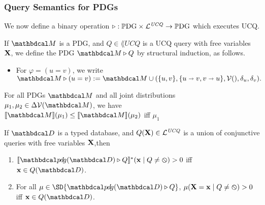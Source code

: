 \documentclass[the-pdg-manual.tex]{subfiles}
\begin{document}
\begin{defn}
\end{defn}


\subsubsection{Query Semantics for PDGs}

We now define a binary operation $\triangleright : \mathbb{P}\mathrm{DG} \times \mathcal L^{\mathit{UCQ}} \to \mathbb{P}\mathrm{DG}$ which executes UCQ.
\begin{defn}[\texorpdfstring{$\qq$}{>}]
  If $\dg M$ is a PDG, and $Q \in \lang{UCQ}$ is a UCQ query with free variables $\mathbf X$, we define the PDG $\dg M \qq Q$ by structural induction, as follows.
  
  \begin{itemize}
  	\item For $\varphi = (u=v)$, we write $\dg M \qq  (u = v) :=  \dg M \cup (\{u,v\}, \{u\shortrightarrow v, v\shortrightarrow u\}, \V(), \delta_{u}, \delta_{v}).$
  \end{itemize}
\end{defn}

\begin{inactive}
\begin{prop}
  For all PDGs $\dg M$ and all joint distributions $\mu_1, \mu_2 \in \Delta\V(\dg M)$, we have
  $\bbr{\dg M}(\mu_{1}) \le \bbr{\dg M}(\mu_{2})$ iff $\mu_{1}$
\end{prop}
\end{inactive}

\begin{prop}
  If $\D$ is a typed database, and $Q(\mathbf X) \in \mathcal L^{\mathit{UCQ}}$ is a union of conjunctive queries with free variables $\mathbf X$,then
  \begin{enumerate}[label=(\alph*)]
	\item $\bbr{\PDGof{\D} \qq Q}^{*}(\mat x \mid Q \ne \none) > 0$ iff $\mat x \in Q(\D)$.
	\item For all $\mu \in \SD{\PDGof{\D} \qq Q}$, $\mu(\mathbf X = \mathbf x \mid Q \neq\varobslash) > 0$ iff $\mat x \in Q(\D)$.
  \end{enumerate}
\end{prop}
\end{document}
